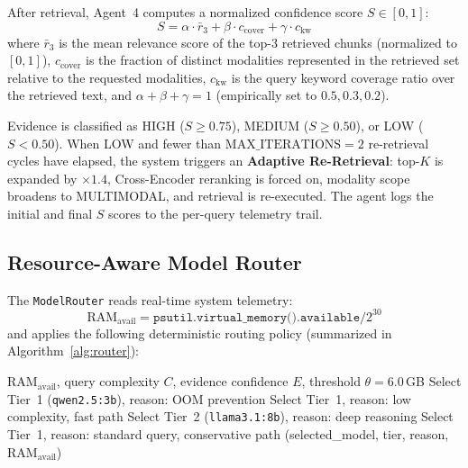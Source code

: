 \documentclass[conference]{IEEEtran}
\begin{document}
After retrieval, Agent~4 computes a normalized confidence score
$S \in [0,1]$:
\begin{equation}
  S = \alpha \cdot \bar{r}_3 + \beta \cdot c_{\text{cover}} + \gamma \cdot c_{\text{kw}}
  \label{eq:confidence}
\end{equation}
where $\bar{r}_3$ is the mean relevance score of the top-3 retrieved chunks
(normalized to $[0,1]$), $c_{\text{cover}}$ is the fraction of distinct
modalities represented in the retrieved set relative to the requested
modalities, $c_{\text{kw}}$ is the query keyword coverage ratio over the
retrieved text, and $\alpha + \beta + \gamma = 1$ (empirically set to
$0.5, 0.3, 0.2$).

Evidence is classified as HIGH ($S \geq 0.75$), MEDIUM ($S \geq 0.50$), or
LOW ($S < 0.50$). When LOW and fewer than $\text{MAX\_ITERATIONS}=2$
re-retrieval cycles have elapsed, the system triggers an
\textbf{Adaptive Re-Retrieval}: top-$K$ is expanded by $\times\!1.4$,
Cross-Encoder reranking is forced on, modality scope broadens to MULTIMODAL,
and retrieval is re-executed. The agent logs the initial and final
$S$ scores to the per-query telemetry trail.

\subsection{Resource-Aware Model Router}
\label{subsec:router}

The \texttt{ModelRouter} reads real-time system telemetry:
\begin{equation}
  \text{RAM}_{\text{avail}} = \texttt{psutil.virtual\_memory().available} / 2^{30}
  \label{eq:ram}
\end{equation}
and applies the following deterministic routing policy (summarized in
Algorithm~\ref{alg:router}):

\begin{algorithm}[h]
\caption{Deterministic Resource-Aware Model Routing}
\label{alg:router}
\begin{algorithmic}[1]
\REQUIRE $\text{RAM}_{\text{avail}}$, query complexity $C$,
         evidence confidence $E$, threshold $\theta = 6.0$\,GB
  \STATE Select Tier~1 (\texttt{qwen2.5:3b}), reason: OOM prevention
  \STATE Select Tier~1, reason: low complexity, fast path
  \STATE Select Tier~2 (\texttt{llama3.1:8b}), reason: deep reasoning
\ELSE
  \STATE Select Tier~1, reason: standard query, conservative path
\ENDIF
\RETURN (selected\_model, tier, reason, $\text{RAM}_{\text{avail}}$)
\end{algorithmic}
\end{algorithm}
\end{document}
